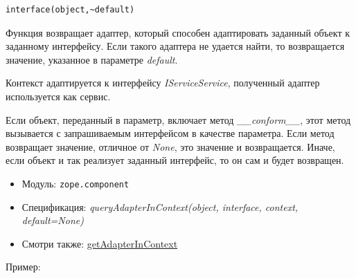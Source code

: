 \documentclass[a4paper,openany,twoside,draft]{book}
\providecommand*{\DUroletitlereference}[1]{\textsl{#1}}
\begin{document}
\begin{verbatim}
interface(object,~default)
\end{verbatim}

Функция возвращает адаптер, который способен адаптировать заданный объект к заданному интерфейсу.  Если такого адаптера не удается найти, то возвращается значение, указанное в параметре \DUroletitlereference{default}.

Контекст адаптируется к интерфейсу \DUroletitlereference{IServiceService}, полученный адаптер используется как сервис.

Если объект, переданный в параметр, включает метод \DUroletitlereference{\_\_conform\_\_}, этот метод вызывается с запрашиваемым интерфейсом в качестве параметра.  Если метод возвращает значение, отличное от \DUroletitlereference{None}, это значение и возвращается.  Иначе, если объект и так реализует заданный интерфейс, то он сам и будет возвращен.

\begin{itemize}

\item Модуль: \texttt{zope.component}

\item Спецификация: \DUroletitlereference{queryAdapterInContext(object, interface, context, default=None)}

\item Смотри также: \hyperref[getadapterincontext]{getAdapterInContext}

\end{itemize}

Пример:
\end{document}
